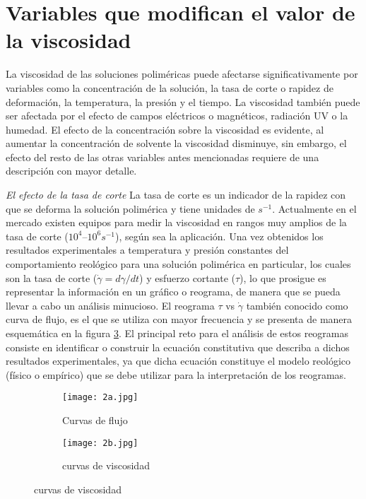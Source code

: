 \documentclass{elsarticle}
\begin{document}
\section{Variables que modifican el valor de la viscosidad}
La viscosidad de las soluciones polim\'ericas puede afectarse significativamente por variables como la concentraci\'on de la soluci\'on, la tasa de corte o rapidez de deformaci\'on, la temperatura, la presi\'on y el tiempo\cite{R1,R5,R7}. La viscosidad tambi\'en puede ser afectada por el efecto de campos el\'ectricos o magn\'eticos, radiaci\'on UV o la humedad. El efecto de la concentraci\'on sobre la viscosidad es evidente, al aumentar la concentraci\'on de solvente la viscosidad disminuye, sin embargo, el efecto del resto de las otras variables antes mencionadas requiere de una descripci\'on con mayor detalle.\newline

\textit{El efecto de la tasa de corte}\newline
La tasa de corte es un indicador de la rapidez con que se deforma la solución polim\'erica y tiene unidades de $s^{-1}$. Actualmente en el mercado existen equipos para medir la viscosidad en rangos muy amplios de la tasa de corte ($10^4 – 10^6 s^{-1}$), seg\'un sea la aplicaci\'on. Una vez obtenidos los resultados experimentales a temperatura y presi\'on constantes del comportamiento reol\'ogico para una soluci\'on polim\'erica en particular, los cuales son la tasa de corte  ($\dot{\gamma}=\textit{d} \gamma / \textit{dt}$) y esfuerzo cortante ($\tau$), lo que prosigue es representar la informaci\'on en un gr\'afico o reograma, de manera que se pueda llevar a cabo un an\'alisis minucioso. El reograma $\tau$ vs $\dot{\gamma}$ tambi\'en conocido como curva de flujo, es el que se utiliza con mayor frecuencia y se presenta de manera esquem\'atica en la figura \ref{Figura 2}. El principal reto para el an\'alisis de estos reogramas consiste en identificar o construir la ecuaci\'on constitutiva que describa a dichos resultados experimentales\cite{R3}, ya que dicha ecuaci\'on constituye el modelo reol\'ogico (f\'isico o emp\'irico) que se debe utilizar para la interpretaci\'on de los reogramas.

\begin{figure}[h!]
\centering
\caption{Representaci\'on esquem\'atica en funci\'on de la tasa de corte.}
\begin{subfigure}[b]{0.45\linewidth}
\texttt{[image: 2a.jpg]}
\caption{Curvas de flujo}
\label{fig:2a}
\end{subfigure}
\begin{subfigure}[b]{0.45\linewidth}
\texttt{[image: 2b.jpg]}
\caption{curvas de viscosidad}
\label{fig:2b}
\end{subfigure}
\label{Figura 2}
\end{figure}
\end{document}
